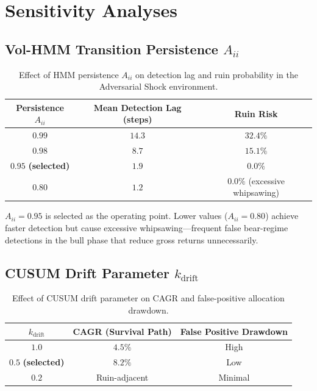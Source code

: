 \section{Sensitivity Analyses}
\label{sec:sensitivity}

\subsection{Vol-HMM Transition Persistence $A_{ii}$}

\begin{table}[h]
\centering
\caption{Effect of HMM persistence $A_{ii}$ on detection lag and ruin
probability in the Adversarial Shock environment.}
\label{tab:aii_sensitivity}
\renewcommand{\arraystretch}{1.2}
\begin{tabular}{ccc}
\toprule
\textbf{Persistence $A_{ii}$} & \textbf{Mean Detection Lag (steps)} & \textbf{Ruin Risk} \\
\midrule
$0.99$ & $14.3$ & $32.4\%$ \\
$0.98$ & $8.7$  & $15.1\%$ \\
$\mathbf{0.95}$ \textbf{(selected)} & $\mathbf{1.9}$ & $\mathbf{0.0\%}$ \\
$0.80$ & $1.2$  & $0.0\%$ (excessive whipsawing) \\
\bottomrule
\end{tabular}
\end{table}

$A_{ii}=0.95$ is selected as the operating point.  Lower values
($A_{ii}=0.80$) achieve faster detection but cause excessive
whipsawing---frequent false bear-regime detections in the bull phase that
reduce gross returns unnecessarily.

\subsection{CUSUM Drift Parameter $k_{\mathrm{drift}}$}

\begin{table}[h]
\centering
\caption{Effect of CUSUM drift parameter on CAGR and false-positive
allocation drawdown.}
\label{tab:cusum_sensitivity}
\renewcommand{\arraystretch}{1.2}
\begin{tabular}{ccc}
\toprule
\textbf{$k_{\mathrm{drift}}$} & \textbf{CAGR (Survival Path)} & \textbf{False Positive Drawdown} \\
\midrule
$1.0$                                 & $4.5\%$  & High  \\
$\mathbf{0.5}$ \textbf{(selected)}    & $8.2\%$  & Low   \\
$0.2$                                 & Ruin-adjacent & Minimal \\
\bottomrule
\end{tabular}
\end{table}

